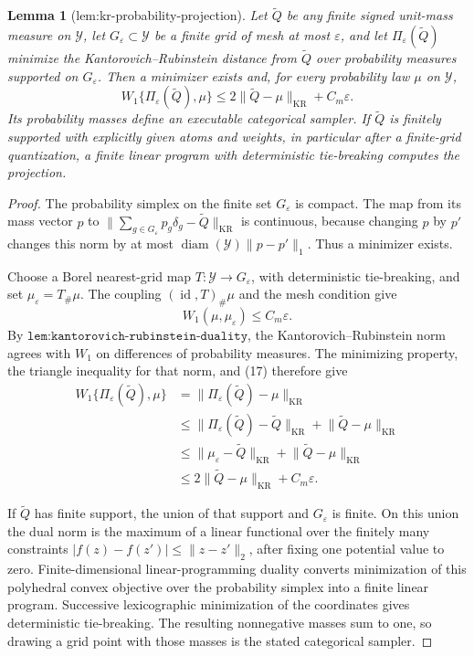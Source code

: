 \documentclass{article}
\newtheorem{lemma}{Lemma}
\begin{document}
\begin{lemma}[lem:kr-probability-projection]\label{lem:kr-probability-projection}
Let \(\widetilde Q\) be any finite signed unit-mass measure on \(\mathcal Y\), let \(G_{\varepsilon}\subset\mathcal Y\) be a finite grid of mesh at most \(\varepsilon\), and let \(\Pi_{\varepsilon}(\widetilde Q)\) minimize the Kantorovich--Rubinstein distance from \(\widetilde Q\) over probability measures supported on \(G_{\varepsilon}\).  Then a minimizer exists and, for every probability law \(\mu\) on \(\mathcal Y\),
\[
 W_1\{\Pi_{\varepsilon}(\widetilde Q),\mu\}
 \leq2\lVert\widetilde Q-\mu\rVert_{\mathrm{KR}}+C_m\varepsilon.
\]
Its probability masses define an executable categorical sampler.  If \(\widetilde Q\) is finitely supported with explicitly given atoms and weights, in particular after a finite-grid quantization, a finite linear program with deterministic tie-breaking computes the projection.
\end{lemma}
\begin{proof}
The probability simplex on the finite set \(G_\varepsilon\) is compact.  The map from its mass vector \(p\) to \(\lVert\sum_{g\in G_\varepsilon}p_g\delta_g-\widetilde Q\rVert_{\mathrm{KR}}\) is continuous, because changing \(p\) by \(p'\) changes this norm by at most \(\operatorname{diam}(\mathcal Y)\lVert p-p'\rVert_1\).  Thus a minimizer exists.

Choose a Borel nearest-grid map \(T:\mathcal Y\to G_\varepsilon\), with deterministic tie-breaking, and set \(\mu_\varepsilon=T_\#\mu\).  The coupling \((\operatorname{id},T)_\#\mu\) and the mesh condition give
\[
 W_1(\mu,\mu_\varepsilon)\leq C_m\varepsilon.
 \tag{17}
\]
By \(\texttt{lem:kantorovich-rubinstein-duality}\), the Kantorovich--Rubinstein norm agrees with \(W_1\) on differences of probability measures.  The minimizing property, the triangle inequality for that norm, and (17) therefore give
\[
\begin{aligned}
 W_1\{\Pi_\varepsilon(\widetilde Q),\mu\}
 &=\lVert\Pi_\varepsilon(\widetilde Q)-\mu\rVert_{\mathrm{KR}}\\
 &\leq\lVert\Pi_\varepsilon(\widetilde Q)-\widetilde Q\rVert_{\mathrm{KR}}
       +\lVert\widetilde Q-\mu\rVert_{\mathrm{KR}}\\
 &\leq\lVert\mu_\varepsilon-\widetilde Q\rVert_{\mathrm{KR}}
       +\lVert\widetilde Q-\mu\rVert_{\mathrm{KR}}\\
 &\leq2\lVert\widetilde Q-\mu\rVert_{\mathrm{KR}}+C_m\varepsilon.
\end{aligned}
\]

If \(\widetilde Q\) has finite support, the union of that support and \(G_\varepsilon\) is finite.  On this union the dual norm is the maximum of a linear functional over the finitely many constraints \(|f(z)-f(z')|\leq\lVert z-z'\rVert_2\), after fixing one potential value to zero.  Finite-dimensional linear-programming duality converts minimization of this polyhedral convex objective over the probability simplex into a finite linear program.  Successive lexicographic minimization of the coordinates gives deterministic tie-breaking.  The resulting nonnegative masses sum to one, so drawing a grid point with those masses is the stated categorical sampler.
\end{proof}
\end{document}
